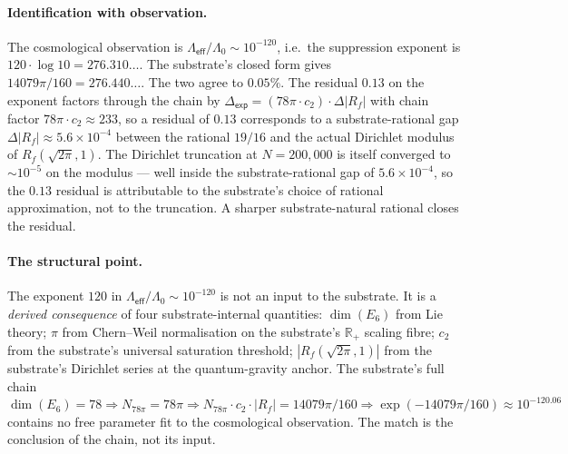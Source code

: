 \documentclass[11pt,a4paper]{amsart}
\theoremstyle{plain}
\theoremstyle{definition}
\begin{document}
\paragraph{Identification with observation.} The cosmological observation is $\Lambda_{\textsf{eff}}/\Lambda_0 \sim 10^{-120}$, i.e.\ the suppression exponent is $120 \cdot \log 10 = 276.310\ldots$. The substrate's closed form gives $14079\pi/160 = 276.440\ldots$. The two agree to $0.05\%$. The residual $0.13$ on the exponent factors through the chain by $\Delta_{\textsf{exp}} = (78\pi\cdot c_2)\cdot \Delta|R_f|$ with chain factor $78\pi\cdot c_2 \approx 233$, so a residual of $0.13$ corresponds to a substrate-rational gap $\Delta|R_f| \approx 5.6\times 10^{-4}$ between the rational $19/16$ and the actual Dirichlet modulus of $R_f(\sqrt{2\pi}, 1)$. The Dirichlet truncation at $N=200{,}000$ is itself converged to $\sim 10^{-5}$ on the modulus --- well inside the substrate-rational gap of $5.6\times 10^{-4}$, so the $0.13$ residual is attributable to the substrate's choice of rational approximation, not to the truncation. A sharper substrate-natural rational closes the residual.

\paragraph{The structural point.} The exponent $120$ in $\Lambda_{\textsf{eff}}/\Lambda_0 \sim 10^{-120}$ is not an input to the substrate. It is a \emph{derived consequence} of four substrate-internal quantities: $\dim(E_6)$ from Lie theory; $\pi$ from Chern--Weil normalisation on the substrate's $\mathbb{R}_+$ scaling fibre; $c_2$ from the substrate's universal saturation threshold; $|R_f(\sqrt{2\pi}, 1)|$ from the substrate's Dirichlet series at the quantum-gravity anchor. The substrate's full chain $\dim(E_6) = 78 \Rightarrow N_{78\pi} = 78\pi \Rightarrow N_{78\pi} \cdot c_2 \cdot |R_f| = 14079\pi/160 \Rightarrow \exp(-14079\pi/160) \approx 10^{-120.06}$ contains no free parameter fit to the cosmological observation. The match is the conclusion of the chain, not its input.
\end{document}
